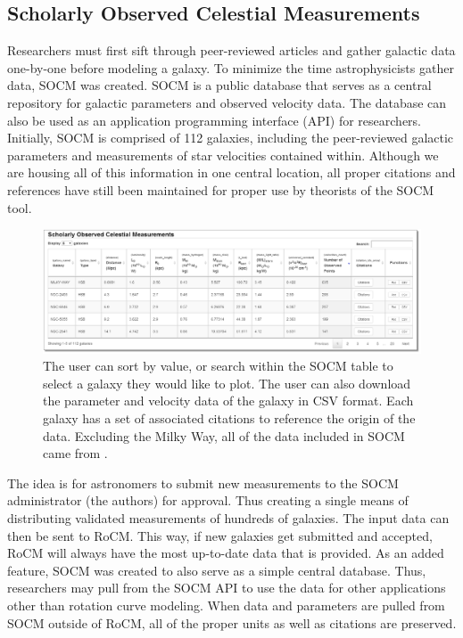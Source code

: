 \documentclass[conference]{IEEEtran-modified}
\begin{document}
\subsection{Scholarly Observed Celestial Measurements}
Researchers must first sift through peer-reviewed articles and gather galactic data one-by-one before modeling a galaxy. To minimize the time astrophysicists gather data, SOCM was created. SOCM is a public database that serves as a central repository for galactic parameters and observed velocity data. The database can also be used as an application programming interface (API) for researchers. Initially, SOCM is comprised of 112 galaxies, including the peer-reviewed galactic parameters and measurements of star velocities contained within.  Although we are housing all of this information in one central location, all proper citations and references have still been maintained for proper use by theorists of the SOCM tool.
       

\begin{figure}[!h]
\centering
\includegraphics[width=\textwidth]{socmtable}
\caption{The user can sort by value, or search within the SOCM table to select a galaxy they would like to plot. The user can also download the parameter and velocity data of the galaxy in CSV format. Each galaxy has a set of associated citations to reference the origin of the data. Excluding the Milky Way, all of the data included in SOCM came from \cite{mannheim}.}
\label{socm_fig}
\end{figure}


The idea is for astronomers to submit new measurements to the SOCM administrator (the authors) for approval. Thus creating a single means of distributing validated measurements of hundreds of galaxies. The input data can then be sent to RoCM. This way, if new galaxies get submitted and accepted, RoCM will always have the most up-to-date data that is provided. As an added feature, SOCM was created to also serve as a simple central database.  Thus, researchers may pull from the SOCM API to use the data for other applications other than rotation curve modeling.  When data and parameters are pulled from SOCM outside of RoCM, all of the proper units as well as citations are preserved.
\end{document}
